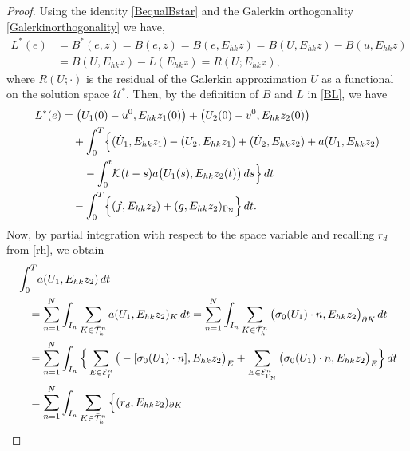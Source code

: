 \documentclass{amsart}
\numberwithin{equation}{section}
\theoremstyle{definition}
\begin{document}
\begin{proof}
Using the identity \eqref{BequalBstar} and the Galerkin
orthogonality \eqref{Galerkinorthogonality} we have,
\begin{equation}   \label{errorrep:eq0}
  \begin{split}
    L^*(e)&=B^*(e,z)=B(e,z)
      =B(e,E_{hk}z)
      =B(U,E_{hk}z)-B(u,E_{hk}z)\\
    &=B(U,E_{hk}z)-L(E_{hk}z)=R(U;E_{hk}z),
  \end{split}
\end{equation}
where $R(U;\cdot)$ is the residual of the Galerkin
approximation $U$ as a functional on the solution space ${\mathcal U}^*$. 
Then, by the definition of $B$ and $L$ in \eqref{BL}, we have
\begin{equation}   \label{errorrep:eq1}
  \begin{split}
    L^*(e)&=
    \big(U_1(0)-u^0,E_{hk}z_1(0)\big)
    +\big(U_2(0)-v^0,E_{hk}z_2(0)\big)\\
    &\quad+\int_0^T\! \Big\{
     (\dot U_1,E_{hk}z_1)-(U_2,E_{hk}z_1)
      +(\dot{U}_2,E_{hk}z_2)+a(U_1,E_{hk}z_2)\\
    &\quad\quad-\int_0^t\!
      {\mathcal K}(t-s)a\big(U_1(s),E_{hk}z_2(t)\big)\,ds\Big\}\,dt\\
    &\quad-\int_0^T\!
      \Big\{(f,E_{hk}z_2)+(g,E_{hk}z_2)_{\Gamma_{\text N}}\Big\}\,dt.
  \end{split}
\end{equation}
Now, by partial integration with respect to the space variable and 
recalling $r_d$ from \eqref{rh}, we obtain
\begin{equation}   \label{errorrep:intbyparts1}
  \begin{split}
     &\int_0^T\! a(U_1,E_{hk}z_2)\,dt\\
     &\quad =\sum_{n=1}^N\int_{I_n}
      \sum_{K\in\bar{\mathcal T}_h^n}a(U_1,E_{hk}z_2)_{K}\,dt
    =\sum_{n=1}^N\int_{I_n}
      \sum_{K\in\bar{\mathcal T}_h^n}
      \big(\sigma_0(U_1)\cdot n,E_{hk}z_2\big)_{\partial K}\,dt\\
    &\quad=\sum_{n=1}^N\int_{I_n}\Big\{
      \sum_{E\in {\mathcal E}_I^n}
      \big(-[\sigma_0(U_1)\cdot n],E_{hk}z_2\big)_E
    
       +\sum_{E\in {\mathcal E}_{\Gamma_{\text N}}^n}
        \big(\sigma_0(U_1)\cdot n,E_{hk}z_2\big)_E\Big\}\,dt\\
    &\quad=\sum_{n=1}^N \int_{I_n}\sum_{K\in \bar{\mathcal T}_h^n}
      \Big\{
      (r_d,E_{hk}z_2)_{\partial K}
    

\end{split}
\end{equation}
\end{proof}
\end{document}
